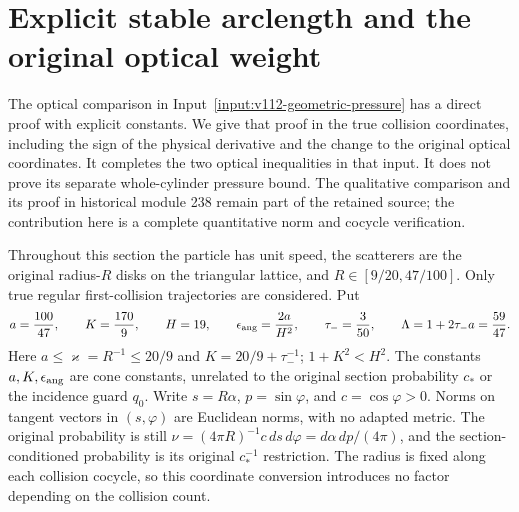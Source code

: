 \section{Explicit stable arclength and the original optical weight}
\label{sec:eo-optical}

The optical comparison in Input~\ref{input:v112-geometric-pressure}
has a direct proof with explicit constants.  We give that proof in
the true collision coordinates, including the sign of the physical
derivative and the change to the original optical coordinates.
It completes the two optical inequalities in that input.  It does
not prove its separate whole-cylinder pressure bound.
The qualitative comparison and its proof in historical module 238
remain part of the retained source; the contribution here is a
complete quantitative norm and cocycle verification.

Throughout this section the particle has unit speed, the scatterers
are the original radius-$R$ disks on the triangular lattice, and
$R\in[9/20,47/100]$.  Only true regular first-collision trajectories
are considered.  Put
\begin{equation}\label{eq:eo-constants}
 a=\frac{100}{47},\qquad K=\frac{170}{9},\qquad H=19,\qquad
 \epsilon_{\rm ang}=\frac{2a}{H^2},\qquad
 \tau_-=\frac3{50},\qquad
 \Lambda=1+2\tau_-a=\frac{59}{47}.
\end{equation}
Here $a\le\varkappa=R^{-1}\le20/9$ and
$K=20/9+\tau_-^{-1}$; $1+K^2<H^2$.
The constants $a,K,\epsilon_{\rm ang}$ are cone constants, unrelated
to the original section probability $c_*$ or the incidence guard
$q_0$.  Write $s=R\alpha$, $p=\sin\varphi$, and
$c=\cos\varphi>0$.  Norms on tangent vectors in $(s,\varphi)$
are Euclidean norms, with no adapted metric.
The original probability is still
$\nu=(4\pi R)^{-1}c\,ds\,d\varphi=d\alpha\,dp/(4\pi)$,
and the section-conditioned probability is its original
$c_*^{-1}$ restriction.  The radius is fixed along each
collision cocycle, so this coordinate conversion introduces
no factor depending on the collision count.

